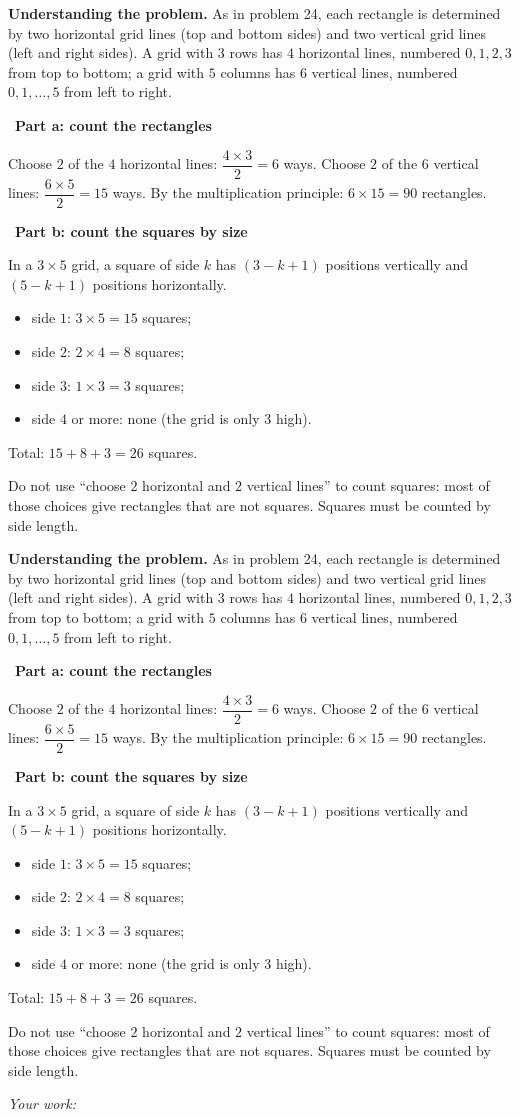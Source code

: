 \documentclass[11pt]{article}
\newif\ifsol \soltrue
\newcommand{\probsol}[1]{%
  \begin{lrbox}{\solmeasure}\begin{minipage}{\dimexpr\linewidth-24pt\relax}#1\end{minipage}\end{lrbox}%
  \ifsol
    \begin{solbox}#1\end{solbox}%
  \else
    \setlength{\solht}{\dimexpr\ht\solmeasure+\dp\solmeasure+0.85cm\relax}%
    \ifdim\solht<1.35cm\setlength{\solht}{1.35cm}\fi
    \ifdim\solht>\StudentMaxWork\setlength{\solht}{\StudentMaxWork}\fi
    \begin{tcolorbox}[colback=white,colframe=Line,boxrule=0.8pt,arc=5pt,
      left=8pt,right=8pt,top=4pt,bottom=4pt,height=\solht]{\footnotesize\color{Slate}\itshape\WorkWord}\end{tcolorbox}%
  \fi}
\newlength{\StudentMaxWork}\setlength{\StudentMaxWork}{7.5cm}
\newcommand{\step}[2]{\par\smallskip\noindent{\bfseries\color{tmBlue!85!black}\StepWord~#1.}\ {\bfseries #2}\par\nopagebreak}
\def\WorkWord{Your work:}
\def\StepWord{Step}
\begin{document}
\probsol{
\textbf{Understanding the problem.} As in problem 24, each rectangle is determined by two horizontal grid lines (top and bottom sides) and
two vertical grid lines (left and right sides). A grid with $3$ rows has $4$ horizontal lines, numbered $0,1,2,3$ from top to bottom; a grid
with $5$ columns has $6$ vertical lines, numbered $0,1,\dots,5$ from left to right.

\step{1}{Part a: count the rectangles}
Choose $2$ of the $4$ horizontal lines: $\dfrac{4\times3}{2}=6$ ways. Choose $2$ of the $6$ vertical lines: $\dfrac{6\times5}{2}=15$ ways.
By the multiplication principle: $6\times15=90$ rectangles.

\step{2}{Part b: count the squares by size}
\begin{recallbox}In a $3\times5$ grid, a square of side $k$ has $(3-k+1)$ positions vertically and $(5-k+1)$ positions horizontally.\end{recallbox}
\begin{itemize}[leftmargin=1.2em,itemsep=1pt,topsep=2pt]
\item side $1$: $3\times5=15$ squares;
\item side $2$: $2\times4=8$ squares;
\item side $3$: $1\times3=3$ squares;
\item side $4$ or more: none (the grid is only $3$ high).
\end{itemize}
Total: $15+8+3=26$ squares.
\begin{warnbox}Do not use ``choose $2$ horizontal and $2$ vertical lines'' to count squares: most of those choices give rectangles that are not
squares. Squares must be counted by side length.\end{warnbox}

}
\end{document}
